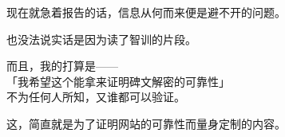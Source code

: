 现在就急着报告的话，信息从何而来便是避不开的问题。

也没法说实话是因为读了智训的片段。

而且，我的打算是——\\

「我希望这个能拿来证明碑文解密的可靠性」\\

不为任何人所知，又谁都可以验证。

这，简直就是为了证明网站的可靠性而量身定制的内容。\\
